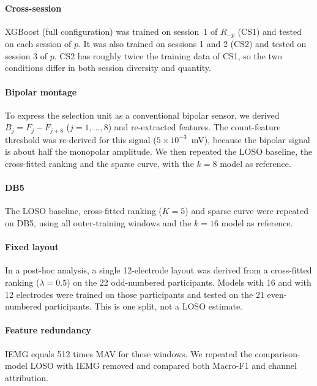 \paragraph{Cross-session} XGBoost (full configuration) was trained on session~1 of $R_{-p}$ (CS1) and tested on each session of $p$. It was also trained on sessions 1 and 2 (CS2) and tested on session 3 of $p$. CS2 has roughly twice the training data of CS1, so the two conditions differ in both session diversity and quantity.

\paragraph{Bipolar montage} To express the selection unit as a conventional bipolar sensor, we derived $B_j = F_j - F_{j+8}$ ($j = 1, \ldots, 8$) and re-extracted features. The count-feature threshold was re-derived for this signal ($5 \times 10^{-3}$~mV), because the bipolar signal is about half the monopolar amplitude. We then repeated the LOSO baseline, the cross-fitted ranking and the sparse curve, with the $k = 8$ model as reference.

\paragraph{DB5} The LOSO baseline, cross-fitted ranking ($K = 5$) and sparse curve were repeated on DB5, using all outer-training windows and the $k = 16$ model as reference.

\paragraph{Fixed layout} In a post-hoc analysis, a single 12-electrode layout was derived from a cross-fitted ranking ($\lambda = 0.5$) on the 22 odd-numbered participants. Models with 16 and with 12 electrodes were trained on those participants and tested on the 21 even-numbered participants. This is one split, not a LOSO estimate.

\paragraph{Feature redundancy} IEMG equals 512 times MAV for these windows. We repeated the comparison-model LOSO with IEMG removed and compared both Macro-F1 and channel attribution.

